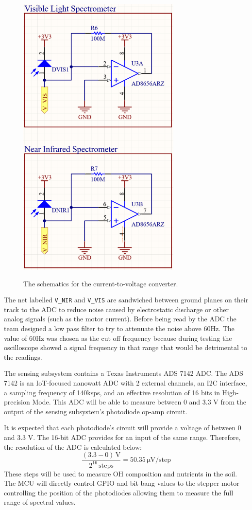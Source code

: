 \documentclass[journal]{IEEEtran}
\begin{document}
\begin{figure}[H]
    \centering
    \includegraphics[height=.25\textheight]{images/SensorSchematics.PNG}
    \label{fig:sensor-schematic}
    \caption{The schematics for the current-to-voltage converter.}
\end{figure}
The net labelled \verb|V_NIR| and \verb|V_VIS| are sandwiched between ground planes on their track
to the ADC to reduce noise caused by electrostatic discharge or other analog signals (such as the
motor current). Before being read by the ADC the team designed a low pass filter to try to attenuate
the noise above 60Hz. The value of 60Hz was chosen as the cut off frequency because during
testing the oscilloscope showed a signal frequency in that range that would be detrimental to the
readings.

The sensing subsystem contains a Texas Instruments ADS 7142 ADC. The ADS 7142 is an IoT-focused nanowatt ADC with 2 external channels, an I2C interface, a sampling frequency of 140ksps, and an effective resolution of 16 bits in High-precision Mode. This ADC will be able to measure between 0 and 3.3 V from the output of the sensing subsystem's  photodiode op-amp circuit.

It is expected that each photodiode's circuit will provide a voltage of between 0 and 3.3 V. The 16-bit ADC provides for an input of the same range. Therefore, the resolution of the ADC is calculated below:
\begin{equation}
    \frac{(3.3 - 0)\,\mathrm{V}}{2^{16}\,\mathrm{steps}} =
    50.35\,\mathrm{\mu V}/\mathrm{step}
\end{equation}
These steps will be used to measure OH composition and nutrients in the soil. The MCU will directly control GPIO and bit-bang values to the stepper motor controlling the position of the photodiodes allowing them to measure the full range of spectral values.
\end{document}
